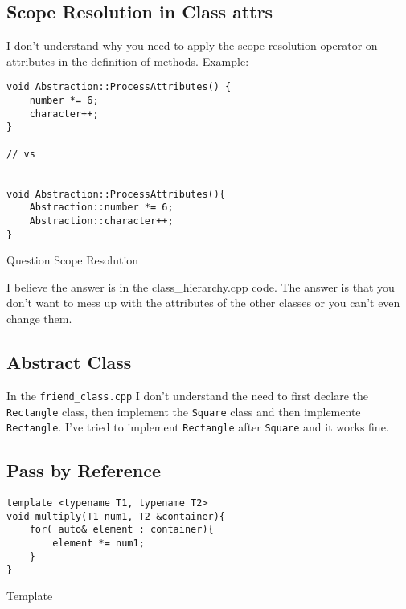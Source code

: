 \documentclass[11pt, a4paper]{article}
\begin{document}
\subsection{Scope Resolution in Class attrs}%
\label{sub:scoperes_class_attrs}

I don't understand why you need to apply the scope resolution operator on attributes in the definition of methods. Example:


\begin{listing}[hbt!]
\begin{verbatim}
void Abstraction::ProcessAttributes() {
    number *= 6;
    character++;
}

// vs


void Abstraction::ProcessAttributes(){
	Abstraction::number *= 6;
	Abstraction::character++;
}
\end{verbatim}
\caption{Question Scope Resolution}
\label{lst:question_scope_resolution}
\end{listing}

I believe the answer is in the class\_hierarchy.cpp code. The answer is that you don't want to mess up with the attributes of the other classes or you can't even change them.



\subsection{Abstract Class}%
\label{sub:abstract_class}



In the \texttt{friend\_class.cpp} I don't understand the need to first declare the \texttt{Rectangle} class, then implement the \texttt{Square} class and then implemente \texttt{Rectangle}. I've tried to implement \texttt{Rectangle} after \texttt{Square} and it works fine.


\subsection{Pass by Reference}%
\label{sub:pass_by_reference}



\begin{listing}[hbt!]
\begin{verbatim}
template <typename T1, typename T2>
void multiply(T1 num1, T2 &container){
	for( auto& element : container){
		element *= num1;	
	}
}
\end{verbatim}
\caption{Template}
\label{lst:template}
\end{listing}
\end{document}
